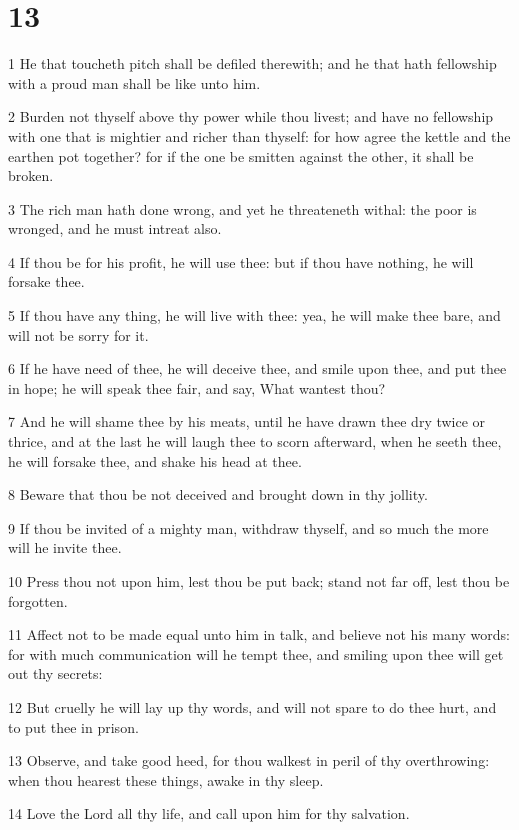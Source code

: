 \chapter{13}

\par 1 He that toucheth pitch shall be defiled therewith; and he that hath fellowship with a proud man shall be like unto him.
\par 2 Burden not thyself above thy power while thou livest; and have no fellowship with one that is mightier and richer than thyself: for how agree the kettle and the earthen pot together? for if the one be smitten against the other, it shall be broken.
\par 3 The rich man hath done wrong, and yet he threateneth withal: the poor is wronged, and he must intreat also.
\par 4 If thou be for his profit, he will use thee: but if thou have nothing, he will forsake thee.
\par 5 If thou have any thing, he will live with thee: yea, he will make thee bare, and will not be sorry for it.
\par 6 If he have need of thee, he will deceive thee, and smile upon thee, and put thee in hope; he will speak thee fair, and say, What wantest thou?
\par 7 And he will shame thee by his meats, until he have drawn thee dry twice or thrice, and at the last he will laugh thee to scorn afterward, when he seeth thee, he will forsake thee, and shake his head at thee.
\par 8 Beware that thou be not deceived and brought down in thy jollity.
\par 9 If thou be invited of a mighty man, withdraw thyself, and so much the more will he invite thee.
\par 10 Press thou not upon him, lest thou be put back; stand not far off, lest thou be forgotten.
\par 11 Affect not to be made equal unto him in talk, and believe not his many words: for with much communication will he tempt thee, and smiling upon thee will get out thy secrets:
\par 12 But cruelly he will lay up thy words, and will not spare to do thee hurt, and to put thee in prison.
\par 13 Observe, and take good heed, for thou walkest in peril of thy overthrowing: when thou hearest these things, awake in thy sleep.
\par 14 Love the Lord all thy life, and call upon him for thy salvation.
